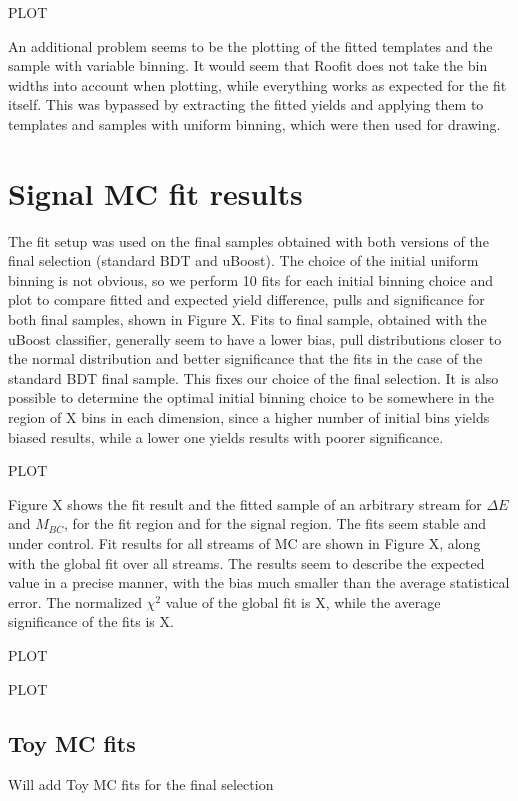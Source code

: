 \documentclass[oneside,a4paper,openany,12pt]{scrbook}
\begin{document}
PLOT

An additional problem seems to be the plotting of the fitted templates and the sample with variable binning. It would seem that Roofit does not take the bin widths into account when plotting, while everything works as expected for the fit itself. This was bypassed by extracting the fitted yields and applying them to templates and samples with uniform binning, which were then used for drawing.

\section{Signal MC fit results}

The fit setup was used on the final samples obtained with both versions of the final selection (standard BDT and uBoost). The choice of the initial uniform binning is not obvious, so we perform 10 fits for each initial binning choice and plot to compare fitted and expected yield difference, pulls and significance for both final samples, shown in Figure X. Fits to final sample, obtained with the uBoost classifier, generally seem to have a lower bias, pull distributions closer to the normal distribution and better significance that the fits in the case of the standard BDT final sample. This fixes our choice of the final selection. It is also possible to determine the optimal initial binning choice to be somewhere in the region of X bins in each dimension, since a higher number of initial bins yields biased results, while a lower one yields results with poorer significance.

PLOT

Figure X shows the fit result and the fitted sample of an arbitrary stream for $\Delta E$ and $M_{BC}$, for the fit region and for the signal region. The fits seem stable and under control. Fit results for all streams of MC are shown in Figure X, along with the global fit over all streams. The results seem to describe the expected value in a precise manner, with the bias much smaller than the average statistical error. The normalized $\chi^2$ value of the global fit is X, while the average significance of the fits is X.

PLOT

PLOT

\subsection{Toy MC fits}

Will add Toy MC fits for the final selection
\end{document}
